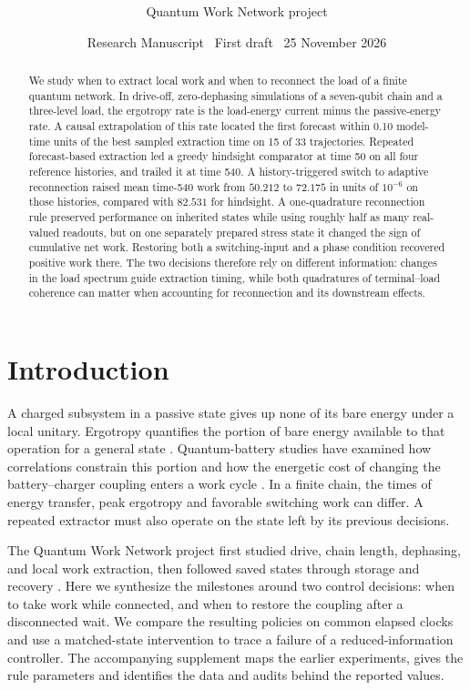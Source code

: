 \documentclass[11pt,a4paper]{article}
\title{\vspace{-1.25em}\color{ink}\bfseries\manuscripttitle}
\author{Quantum Work Network project}
\date{Research Manuscript \textbullet\ First draft \textbullet\ 25 November 2026}
\begin{document}
\maketitle

\begin{abstract}
We study when to extract local work and when to reconnect the load of a finite quantum network. In drive-off, zero-dephasing simulations of a seven-qubit chain and a three-level load, the ergotropy rate is the load-energy current minus the passive-energy rate. A causal extrapolation of this rate located the first forecast within 0.10 model-time units of the best sampled extraction time on 15 of 33 trajectories. Repeated forecast-based extraction led a greedy hindsight comparator at time 50 on all four reference histories, and trailed it at time 540. A history-triggered switch to adaptive reconnection raised mean time-540 work from $50.212$ to $72.175$ in units of $10^{-6}$ on those histories, compared with $82.531$ for hindsight. A one-quadrature reconnection rule preserved performance on inherited states while using roughly half as many real-valued readouts, but on one separately prepared stress state it changed the sign of cumulative net work. Restoring both a switching-input and a phase condition recovered positive work there. The two decisions therefore rely on different information: changes in the load spectrum guide extraction timing, while both quadratures of terminal--load coherence can matter when accounting for reconnection and its downstream effects.
\end{abstract}

\section{Introduction}

A charged subsystem in a passive state gives up none of its bare energy under a local unitary. Ergotropy quantifies the portion of bare energy available to that operation for a general state \cite{pusz,allahverdyan}. Quantum-battery studies have examined how correlations constrain this portion and how the energetic cost of changing the battery--charger coupling enters a work cycle \cite{andolina,barra}. In a finite chain, the times of energy transfer, peak ergotropy and favorable switching work can differ. A repeated extractor must also operate on the state left by its previous decisions.

The Quantum Work Network project first studied drive, chain length, dephasing, and local work extraction, then followed saved states through storage and recovery \cite{project}. Here we synthesize the milestones around two control decisions: when to take work while connected, and when to restore the coupling after a disconnected wait. We compare the resulting policies on common elapsed clocks and use a matched-state intervention to trace a failure of a reduced-information controller. The accompanying supplement maps the earlier experiments, gives the rule parameters and identifies the data and audits behind the reported values.
\end{document}
